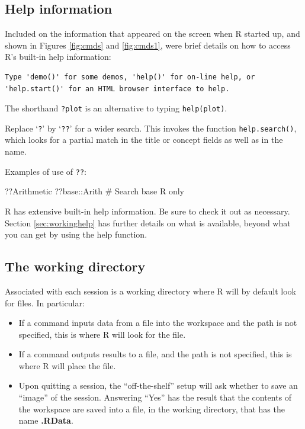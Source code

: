 \documentclass{tufte-book}\usepackage[]{graphicx}\usepackage[]{color}
\newcommand{\txtt}[1]{\texttt{#1}}
\begin{document}
\subsection{Help information}\label{ss:ch1-help}

Included on the information that appeared on the screen when R started
up, and shown in Figures \ref{fig:cmds} and \ref{fig:cmds1}, were brief
details on how to access R's built-in help information:
{\small
\begin{verbatim}
Type 'demo()' for some demos, 'help()' for on-line help, or
'help.start()' for an HTML browser interface to help.
\end{verbatim}
}
\noindent
The shorthand \txtt{?plot} is an alternative to typing
\txtt{help(plot)}.

Replace `\txtt{?}' by `\txtt{??}' for a wider search.  This invokes
the function \txtt{help.search()}, which looks for a partial match
in the title or concept fields as well as in the name.
\begin{marginfigure}[-15pt]
Examples of use of \txtt{??}:\\[-5pt]
\begin{Schunk}
\begin{Sinput}
??Arithmetic
??base::Arith
  # Search base R only
\end{Sinput}
\end{Schunk}
\end{marginfigure}

R has extensive built-in help information.  Be sure to check it out
as necessary.  Section \ref{sec:workinghelp} has further details on
what is available, beyond what you can get by using the help function.

\subsection{The working directory}\label{ss:workdir}

Associated with each session 
is a working directory where R will by default look
for files.  In particular:
\begin{itemize}
\item If a command inputs data from a file into the
workspace and the path is not specified, this is where R
will look for the file.
\item If a command outputs results to a file, and the path is not specified,
this is where R will place the file.
\item Upon quitting a session, the ``off-the-shelf'' setup will ask
  whether to save an ``image'' of the session. 
  Answering
  ``Yes'' has the result that the contents of the workspace are saved
  into a file, in the working directory, that has the name {\bf
    .RData}.  
\end{itemize}
\end{document}
